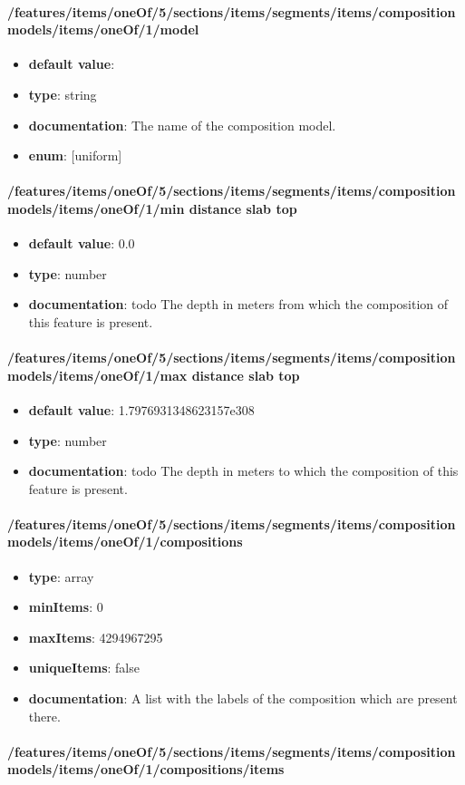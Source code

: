 \paragraph{/features/items/oneOf/5/sections/items/segments/items/composition models/items/oneOf/1/model}
\begin{itemize}\item {\bf default value}: 
\item {\bf type}: string
\item {\bf documentation}: The name of the composition model.
\item {\bf enum}: [uniform]\end{itemize}\paragraph{/features/items/oneOf/5/sections/items/segments/items/composition models/items/oneOf/1/min distance slab top}
\begin{itemize}\item {\bf default value}: 0.0
\item {\bf type}: number
\item {\bf documentation}: todo The depth in meters from which the composition of this feature is present.
\end{itemize}\paragraph{/features/items/oneOf/5/sections/items/segments/items/composition models/items/oneOf/1/max distance slab top}
\begin{itemize}\item {\bf default value}: 1.7976931348623157e308
\item {\bf type}: number
\item {\bf documentation}: todo The depth in meters to which the composition of this feature is present.
\end{itemize}\paragraph{/features/items/oneOf/5/sections/items/segments/items/composition models/items/oneOf/1/compositions}
\begin{itemize}\item {\bf type}: array
\item {\bf minItems}: 0
\item {\bf maxItems}: 4294967295
\item {\bf uniqueItems}: false
\item {\bf documentation}: A list with the labels of the composition which are present there.
\end{itemize}\paragraph{/features/items/oneOf/5/sections/items/segments/items/composition models/items/oneOf/1/compositions/items}
